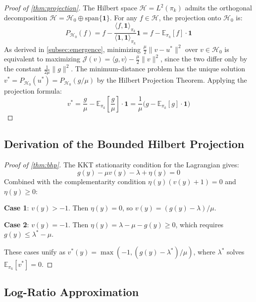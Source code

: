 \documentclass[11pt]{article}
\theoremstyle{definition}
\theoremstyle{remark}
\newcommand{\E}{\mathbb{E}}
\newcommand{\pik}{\pi_k}
\begin{document}
\begin{proof}[Proof of \cref{thm:projection}]
The Hilbert space $\mathcal{H} = L^2(\pik)$ admits the orthogonal decomposition $\mathcal{H} = \mathcal{H}_0 \oplus \text{span}\{\mathbf{1}\}$. For any $f \in \mathcal{H}$, the projection onto $\mathcal{H}_0$ is:
\begin{equation}
    P_{\mathcal{H}_0}(f) = f - \frac{\langle f, \mathbf{1}\rangle_{\pik}}{\langle \mathbf{1}, \mathbf{1}\rangle_{\pik}}\mathbf{1} = f - \E_{\pik}[f] \cdot \mathbf{1}
\end{equation}
As derived in \cref{subsec:emergence}, minimizing $\frac{\mu}{2}\|v - u^*\|^2$ over $v \in \mathcal{H}_0$ is equivalent to maximizing $\mathcal{J}(v) = \langle g, v\rangle - \frac{\mu}{2}\|v\|^2$, since the two differ only by the constant $\frac{1}{2\mu}\|g\|^2$. The minimum-distance problem has the unique solution $v^* = P_{\mathcal{H}_0}(u^*) = P_{\mathcal{H}_0}(g/\mu)$ by the Hilbert Projection Theorem. Applying the projection formula:
\begin{equation}
    v^* = \frac{g}{\mu} - \E_{\pik}\!\left[\frac{g}{\mu}\right]\cdot\mathbf{1} = \frac{1}{\mu}\big(g - \E_{\pik}[g]\cdot\mathbf{1}\big)
\end{equation}
\end{proof}

\subsection{Derivation of the Bounded Hilbert Projection}
\label{app:bhp}

\begin{proof}[Proof of \cref{thm:bhp}]
The KKT stationarity condition for the Lagrangian gives:
\begin{equation}
    g(y) - \mu v(y) - \lambda + \eta(y) = 0
\end{equation}
Combined with the complementarity condition $\eta(y)(v(y) + 1) = 0$ and $\eta(y) \geq 0$:

\textbf{Case 1}: $v(y) > -1$. Then $\eta(y) = 0$, so $v(y) = (g(y) - \lambda)/\mu$.

\textbf{Case 2}: $v(y) = -1$. Then $\eta(y) = \lambda - \mu - g(y) \geq 0$, which requires $g(y) \leq \lambda^* - \mu$.

These cases unify as $v^*(y) = \max(-1, (g(y) - \lambda^*)/\mu)$, where $\lambda^*$ solves $\E_{\pik}[v^*] = 0$.
\end{proof}

\subsection{Log-Ratio Approximation}
\label{app:log_approx}
\end{document}
